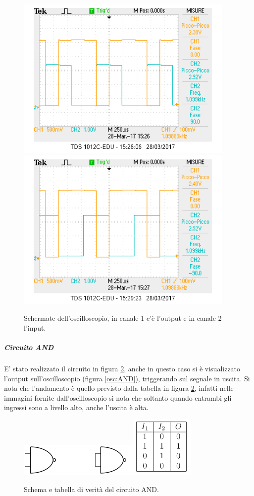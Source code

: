 \documentclass[10pt,a4paper]{article}
\begin{document}
\begin{figure}[!htb]
  \centering
  \includegraphics[scale=0.75]{nand1.png}\includegraphics[scale=0.75]{nand2.png}
\caption{Schermate dell'oscilloscopio, in canale 1 c'è l'output e in canale 2 l'input.\label{osc:NAND}}
\end{figure}


\subparagraph{Circuito AND}
E' stato realizzato il circuito in figura \ref{fig:AND}, anche in questo caso si è visualizzato l'output sull'oscilloscopio (figura \ref{osc:AND}), triggerando sul segnale in uscita. Si nota che l'andamento è quello previsto dalla tabella in figura  \ref{fig:AND}, infatti nelle immagini fornite dall'oscilloscopio si nota che soltanto quando entrambi gli ingressi sono a livello alto, anche l'uscita è alta.\\

\begin{figure}[!htb]
  \centering
  \includegraphics[scale=1]{and.png}\includegraphics[scale=0.9]{tabAND.png}
\caption{Schema e tabella di verità del circuito AND.\label{fig:AND}}
\end{figure}
\end{document}
